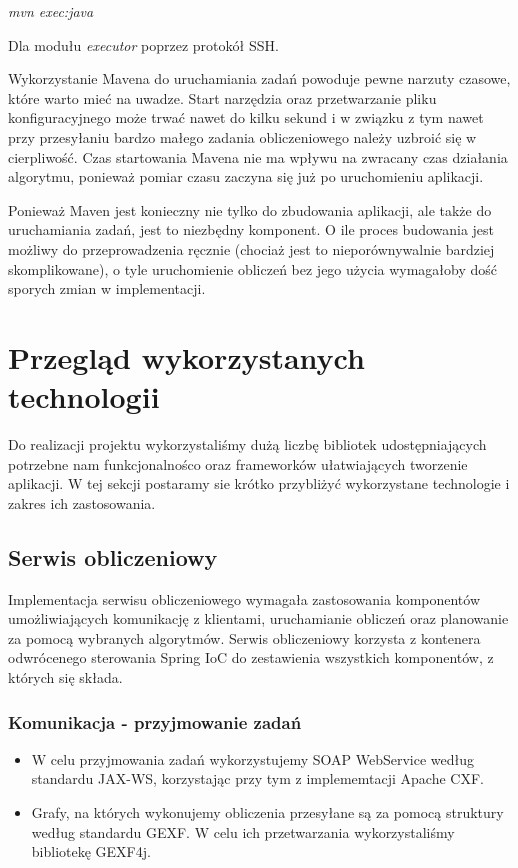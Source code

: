 {\it mvn exec:java}

Dla modułu {\it executor} poprzez protokół SSH.

Wykorzystanie Mavena do uruchamiania zadań powoduje pewne narzuty czasowe, które warto mieć na uwadze.
Start narzędzia oraz przetwarzanie pliku konfiguracyjnego może trwać nawet do kilku sekund i w związku z tym nawet przy przesyłaniu bardzo małego zadania obliczeniowego należy uzbroić się w cierpliwość.
Czas startowania Mavena nie ma wpływu na zwracany czas działania algorytmu, ponieważ pomiar czasu zaczyna się już po uruchomieniu aplikacji.

Ponieważ Maven jest konieczny nie tylko do zbudowania aplikacji, ale także do uruchamiania zadań, jest to niezbędny komponent.
O ile proces budowania jest możliwy do przeprowadzenia ręcznie (chociaż jest to nieporównywalnie bardziej skomplikowane), o tyle uruchomienie obliczeń bez jego użycia wymagałoby dość sporych zmian w implementacji.

\section{Przegląd wykorzystanych technologii}

Do realizacji projektu wykorzystaliśmy dużą liczbę bibliotek udostępniających potrzebne nam funkcjonalnośco oraz frameworków ułatwiających tworzenie aplikacji.
W tej sekcji postaramy sie krótko przybliżyć wykorzystane technologie i zakres ich zastosowania.

\subsection{Serwis obliczeniowy}

Implementacja serwisu obliczeniowego wymagała zastosowania komponentów umożliwiających komunikację z klientami, uruchamianie obliczeń oraz planowanie za pomocą wybranych algorytmów.
Serwis obliczeniowy korzysta z kontenera odwrócenego sterowania Spring IoC do zestawienia wszystkich komponentów, z których się składa.

\subsubsection{Komunikacja - przyjmowanie zadań}

\begin{itemize}
	\item W celu przyjmowania zadań wykorzystujemy SOAP WebService według standardu JAX-WS, korzystając przy tym z implememtacji Apache CXF.
	\item Grafy, na których wykonujemy obliczenia przesyłane są za pomocą struktury według standardu GEXF.
	W celu ich przetwarzania wykorzystaliśmy bibliotekę GEXF4j.
\end{itemize}

